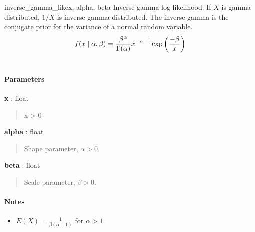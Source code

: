 \hypertarget{pymc.distributions.inverse_gamma_like}{}
\begin{funcdesc}{inverse\_gamma\_like}{x, alpha, beta}
Inverse gamma log-likelihood. If $X$ is gamma distributed, $1/X$ is inverse gamma distributed. The inverse gamma is the conjugate prior for the variance of a normal random variable.
\begin{gather}
\begin{split}f(x \mid \alpha, \beta) = \frac{\beta^{\alpha}}{\Gamma(\alpha)} x^{-\alpha - 1} \exp\left(\frac{-\beta}{x}\right)\end{split}\notag\\\begin{split}\end{split}\notag
\end{gather}
\paragraph{Parameters}
\begin{paramlist}
\item[] \textbf{x} : float
\begin{quote}

x \textgreater{} 0
\end{quote}

\item[] \textbf{alpha} : float
\begin{quote}

Shape parameter, $\alpha > 0$.
\end{quote}

\item[] \textbf{beta} : float
\begin{quote}

Scale parameter, $\beta > 0$.
\end{quote}
\end{paramlist}
\paragraph{Notes}
\begin{itemize}
\item $E(X)=\frac{1}{\beta(\alpha-1)}$  for $\alpha > 1$.
\end{itemize}
\end{funcdesc}

